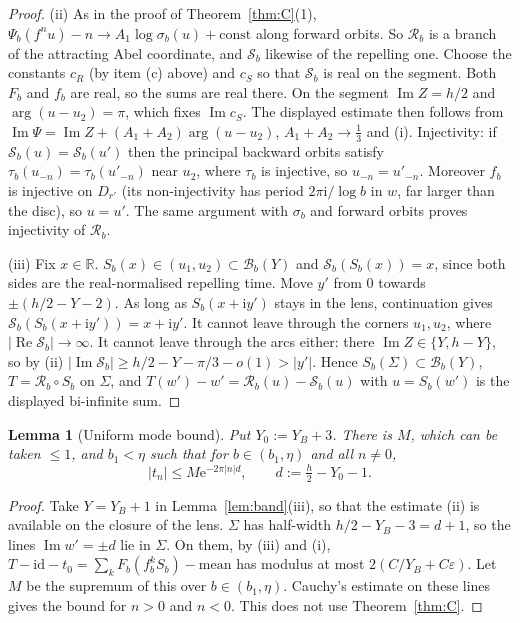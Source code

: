 \documentclass[11pt]{amsart}
\newtheorem{lemma}[theorem]{Lemma}
\theoremstyle{definition}
\newcommand{\eee}{\mathrm{e}}
\newcommand{\ii}{\mathrm{i}}
\begin{document}
\begin{proof}
(ii) As in the proof of Theorem~\ref{thm:C}(1), $\Psi_b(f^nu)-n\to A_1\log\sigma_b(u)+\mathrm{const}$
along forward orbits.  So $\mathcal R_b$ is a branch of the attracting Abel
coordinate, and $\mathcal S_b$ likewise of the repelling one.  Choose the
constants $c_R$ (by item (c) above) and $c_S$ so that $\mathcal S_b$ is real on
the segment.  Both $F_b$ and $f_b$ are real, so the sums are real there.  On
the segment $\operatorname{Im}Z=h/2$ and $\arg(u-u_2)=\pi$, which fixes
$\operatorname{Im}c_S$.  The displayed estimate then follows from
$\operatorname{Im}\Psi=\operatorname{Im}Z+(A_1+A_2)\arg(u-u_2)$,
$A_1+A_2\to\tfrac13$ and (i).  Injectivity: if $\mathcal S_b(u)=\mathcal S_b(u')$
then the principal backward orbits satisfy
$\tau_b(u_{-n})=\tau_b(u'_{-n})$ near $u_2$, where $\tau_b$ is injective, so
$u_{-n}=u'_{-n}$.  Moreover $f_b$ is injective on $D_{r'}$ (its non-injectivity
has period $2\pi\ii/\log b$ in $w$, far larger than the disc), so $u=u'$.  The
same argument with $\sigma_b$ and forward orbits proves injectivity of
$\mathcal R_b$.

(iii) Fix $x\in\mathbb R$.  $S_b(x)\in(u_1,u_2)\subset\mathcal B_b(Y)$ and
$\mathcal S_b(S_b(x))=x$, since both sides are the real-normalised repelling
time.  Move $y'$ from $0$ towards $\pm(h/2-Y-2)$.  As long as $S_b(x+\ii y')$
stays in the lens, continuation gives $\mathcal S_b(S_b(x+\ii y'))=x+\ii y'$.
It cannot leave through the corners $u_1,u_2$, where
$|\operatorname{Re}\mathcal S_b|\to\infty$.  It cannot leave through the arcs
either: there $\operatorname{Im}Z\in\{Y,h-Y\}$, so by (ii)
$|\operatorname{Im}\mathcal S_b|\ge h/2-Y-\pi/3-o(1)>|y'|$.  Hence
$S_b(\Sigma)\subset\mathcal B_b(Y)$, $T=\mathcal R_b\circ S_b$ on $\Sigma$, and
$T(w')-w'=\mathcal R_b(u)-\mathcal S_b(u)$ with $u=S_b(w')$ is the displayed
bi-infinite sum.
\end{proof}

\begin{lemma}[Uniform mode bound]\label{lem:modes}
Put $Y_0:=Y_B+3$.  There is $M$, which can be taken $\le1$, and $b_1<\eta$ such
that for $b\in(b_1,\eta)$ and all $n\ne0$,
\[
 |t_n|\le M\eee^{-2\pi|n|d},\qquad d:=\tfrac h2-Y_0-1 .
\]
\end{lemma}

\begin{proof}
Take $Y=Y_B+1$ in Lemma~\ref{lem:band}(iii), so that the estimate (ii) is
available on the closure of the lens.  $\Sigma$ has half-width
$h/2-Y_B-3=d+1$, so the lines $\operatorname{Im}w'=\pm d$ lie in $\Sigma$.  On them, by (iii) and (i),
$T-\mathrm{id}-t_0=\sum_kF_b(f_b^kS_b)-\text{mean}$ has modulus at most $2(C/Y_B+C\varepsilon)$.  Let $M$ be the supremum of this over
$b\in(b_1,\eta)$.  Cauchy's estimate on these lines gives the bound
for $n>0$ and $n<0$.  This does not use Theorem~\ref{thm:C}.
\end{proof}
\end{document}
